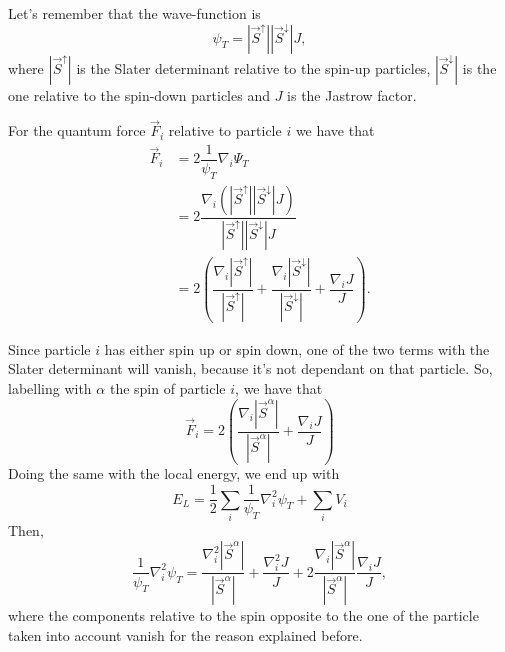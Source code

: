 \documentclass[a4paper,twoside,11pt]{book}
\begin{document}
Let's remember that the wave-function is
\begin{equation}
	\psi_{T} = |\vec{S}^{\uparrow}||\vec{S}^{\downarrow}|J,
\end{equation}
where $|\vec{S}^{\uparrow}|$ is the Slater determinant relative to the spin-up particles, $|\vec{S}^{\downarrow}|$ is the one relative to the spin-down particles and $J$ is the Jastrow factor.

For the quantum force $\vec{F}_i$ relative to particle $i$ we have that
\begin{align}
	\vec{F}_{i} &= 2 \dfrac{1}{\psi_{T}} \nabla_{i} \Psi_{T} \\
	&= 2 \dfrac{\nabla_{i}(|\vec{S}^{\uparrow}||\vec{S}^{\downarrow}|J)}{|\vec{S}^{\uparrow}||\vec{S}^{\downarrow}|J} \\
	&= 2 \left( \dfrac{\nabla_{i}|\vec{S}^{\uparrow}|}{|\vec{S}^{\uparrow}|} + \dfrac{\nabla_{i}|\vec{S}^{\downarrow}|}{|\vec{S}^{\downarrow}|} + \dfrac{\nabla_{i}J}{J} \right).
\end{align}

Since particle $i$ has either spin up or spin down, one of the two terms with the Slater determinant will vanish, because it's not dependant on that particle. So, labelling with $\alpha$ the spin of particle $i$, we have that
\begin{equation}
	\vec{F}_{i} = 2 \left(\dfrac{\nabla_{i}|\vec{S}^{\alpha}|}{|\vec{S}^{\alpha}|} + \dfrac{\nabla_{i}J}{J} \right)
\end{equation}
Doing the same with the local energy, we end up with
\begin{equation}
	E_L= \frac{1}{2} \sum_i \frac{1}{\psi_T} \nabla_i^2 \psi_T + \sum_i V_i
\end{equation}
Then,
\begin{equation}
	\frac{1}{\psi_T} \nabla_i^2 \psi_T= \frac{\nabla_i^2 |\vec{S}^{\alpha}|}{|\vec{S}^{\alpha}|}+\frac{\nabla^2_i J}{J}+2 \frac{\nabla_i |\vec{S}^{\alpha}|}{|
	\vec{S}^{\alpha}|}\frac{\nabla_i J}{J},
	\label{eq:psi_second_derivative}
\end{equation}
where the components relative to the spin opposite to the one of the particle taken into account vanish for the reason explained before.
\end{document}
